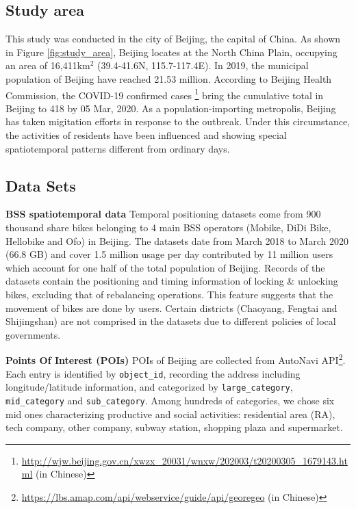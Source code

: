 \documentclass[preprints,article,accept,moreauthors,pdftex]{Definitions/mdpi}
\begin{document}
\subsection{Study area}
This study was conducted in the city of Beijing, the capital of China.
As shown in Figure \ref{fig:study_area}, Beijing locates at the North China Plain, occupying an area of 16,411km$^2$ (39.4{\degree}-41.6{\degree}N, 115.7{\degree}-117.4{\degree}E).
In 2019, the municipal population of Beijing have reached 21.53 million. According to Beijing Health Commission, the COVID-19 confirmed cases \footnote{\url{http://wjw.beijing.gov.cn/xwzx_20031/wnxw/202003/t20200305_1679143.html} (in Chinese)} bring the cumulative total in Beijing to 418 by 05 Mar, 2020.
As a population-importing metropolis, Beijing has taken migitation efforts in response to the outbreak. 
Under this circumstance, the activities of residents have been influenced and showing special spatiotemporal patterns different from ordinary days.

\subsection{Data Sets}
\textbf{BSS spatiotemporal data} Temporal positioning datasets come from 900 thousand share bikes belonging to 4 main BSS operators (Mobike, DiDi Bike, Hellobike and Ofo) in Beijing.
The datasets date from March 2018 to March 2020 (66.8 GB) and cover 1.5 million usage per day contributed by 11 million users which account for one half of the total population of Beijing.
Records of the datasets contain the positioning and timing information of locking \& unlocking bikes, excluding that of rebalancing operations.
This feature suggests that the movement of bikes are done by users.
Certain districts (Chaoyang, Fengtai and Shijingshan) are not comprised in the datasets due to different policies of local governments.

\textbf{Points Of Interest (POIs)} POIs of Beijing are collected from AutoNavi API\footnote{\url{https://lbs.amap.com/api/webservice/guide/api/georegeo} (in Chinese)}.
Each entry is identified by \texttt{object\_id}, recording the address including longitude/latitude information, and categorized by \texttt{large\_category}, \texttt{mid\_category} and \texttt{sub\_category}.
Among hundreds of categories, we chose six mid ones characterizing productive and social activities: residential area (RA), tech company, other company, subway station, shopping plaza and supermarket.
\end{document}
